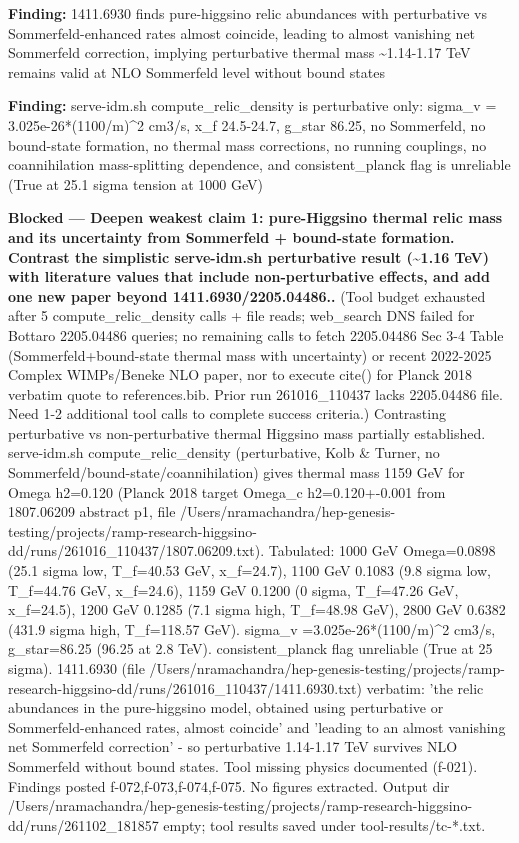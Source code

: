 \documentclass[11pt,a4paper]{article}
\begin{document}
\textbf{Finding:} 1411.6930 finds pure-higgsino relic abundances with perturbative vs Sommerfeld-enhanced rates almost coincide, leading to almost vanishing net Sommerfeld correction, implying perturbative thermal mass \textasciitilde{}1.14-1.17 TeV remains valid at NLO Sommerfeld level without bound states

\textbf{Finding:} serve-idm.sh compute\_relic\_density is perturbative only: sigma\_v = 3.025e-26*(1100/m)\textasciicircum{}2 cm3/s, x\_f 24.5-24.7, g\_star 86.25, no Sommerfeld, no bound-state formation, no thermal mass corrections, no running couplings, no coannihilation mass-splitting dependence, and consistent\_planck flag is unreliable (True at 25.1 sigma tension at 1000 GeV)

\textbf{Blocked --- Deepen weakest claim 1: pure-Higgsino thermal relic mass and its uncertainty from Sommerfeld + bound-state formation. Contrast the simplistic serve-idm.sh perturbative result (\textasciitilde{}1.16 TeV) with literature values that include non-perturbative effects, and add one new paper beyond 1411.6930/2205.04486..} (Tool budget exhausted after 5 compute\_relic\_density calls + file reads; web\_search DNS failed for Bottaro 2205.04486 queries; no remaining calls to fetch 2205.04486 Sec 3-4 Table (Sommerfeld+bound-state thermal mass with uncertainty) or recent 2022-2025 Complex WIMPs/Beneke NLO paper, nor to execute cite() for Planck 2018 verbatim quote to references.bib. Prior run 261016\_110437 lacks 2205.04486 file. Need 1-2 additional tool calls to complete success criteria.) Contrasting perturbative vs non-perturbative thermal Higgsino mass partially established. serve-idm.sh compute\_relic\_density (perturbative, Kolb \& Turner, no Sommerfeld/bound-state/coannihilation) gives thermal mass 1159 GeV for Omega h2=0.120 (Planck 2018 target Omega\_c h2=0.120+-0.001 from 1807.06209 abstract p1, file /Users/nramachandra/hep-genesis-testing/projects/ramp-research-higgsino-dd/runs/261016\_110437/1807.06209.txt). Tabulated: 1000 GeV Omega=0.0898 (25.1 sigma low, T\_f=40.53 GeV, x\_f=24.7), 1100 GeV 0.1083 (9.8 sigma low, T\_f=44.76 GeV, x\_f=24.6), 1159 GeV 0.1200 (0 sigma, T\_f=47.26 GeV, x\_f=24.5), 1200 GeV 0.1285 (7.1 sigma high, T\_f=48.98 GeV), 2800 GeV 0.6382 (431.9 sigma high, T\_f=118.57 GeV). sigma\_v =3.025e-26*(1100/m)\textasciicircum{}2 cm3/s, g\_star=86.25 (96.25 at 2.8 TeV). consistent\_planck flag unreliable (True at 25 sigma). 1411.6930 (file /Users/nramachandra/hep-genesis-testing/projects/ramp-research-higgsino-dd/runs/261016\_110437/1411.6930.txt) verbatim: 'the relic abundances in the pure-higgsino model, obtained using perturbative or Sommerfeld-enhanced rates, almost coincide' and 'leading to an almost vanishing net Sommerfeld correction' - so perturbative 1.14-1.17 TeV survives NLO Sommerfeld without bound states. Tool missing physics documented (f-021). Findings posted f-072,f-073,f-074,f-075. No figures extracted. Output dir /Users/nramachandra/hep-genesis-testing/projects/ramp-research-higgsino-dd/runs/261102\_181857 empty; tool results saved under tool-results/tc-*.txt.
\end{document}

